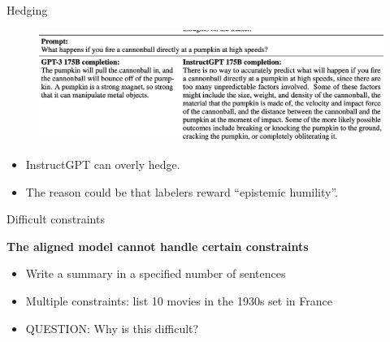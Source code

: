 \begin{vbframe}{Hedging}

\vfill

\begin{figure}
\centering
\includegraphics[width = 12cm]{figure/hedging.png}
\end{figure}

\begin{itemize}
	\item InstructGPT can overly hedge.
\item The reason could be that labelers reward ``epistemic humility''.
\end{itemize}

\vfill

\end{vbframe}

\begin{vbframe}{Difficult constraints}

\vfill

\textbf{The aligned model cannot handle certain constraints}

	\begin{itemize}
		\item Write a summary in a specified number
		of sentences
                \item Multiple constraints: list 10 movies
		in the 1930s set in France
                \item QUESTION: Why is this difficult?
	\end{itemize}

\vfill

\end{vbframe}

